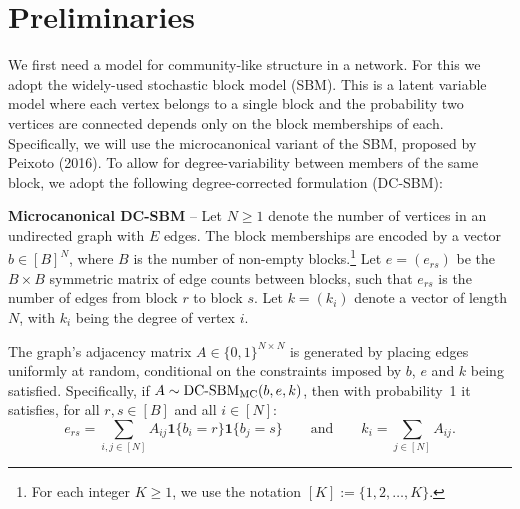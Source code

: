 \section{Preliminaries}

We first need a model for community-like structure in a network. For this we adopt the widely-used stochastic block model (SBM). This is a latent variable model where each vertex belongs to a single block and the probability two vertices are connected depends only on the block memberships of each.
Specifically, we will use the microcanonical variant of the SBM, proposed by Peixoto (2016). To allow for degree-variability between members of the same block, we adopt the following degree-corrected 
formulation (DC-SBM):

\textbf{Microcanonical DC-SBM} --
Let $N \geq 1$ denote the number of vertices in an undirected graph
with $E$ edges. The block memberships are encoded by a vector $b \in [B]^N$,
where $B$ is the number of non-empty blocks.\footnote{For each integer $K\geq 1$, we use the notation $[K]:=\{1,2,\ldots,K\}$.}
	Let $e=(e_{rs})$ be the $B \times B$ symmetric matrix of edge counts 
between blocks, such that $e_{rs}$ is the number of edges from block $r$ to 
block $s$. 
	Let $k =(k_i)$ denote a vector of length $N$, with $k_i$ being the degree of vertex $i$.

The graph's adjacency matrix $A \in \{0,1\}^{N \times N}$ is generated 
by placing edges uniformly at random, conditional
on the constraints imposed by $b$, $e$ and $k$ being satisfied.
Specifically, if $A \sim \mbox{\rm DC-SBM}_{\rm MC} (b, e, k)$,
then with probability~1 it satisfies,
for all $r,s\in[B]$
and all $i\in[N]$:
%
\begin{equation}
	e_{rs} = \sum_{i, j \in [N]} A_{ij} 
\boldsymbol{1} \{b_i = r\} \boldsymbol{1} \{b_j = s\} 
	\qquad 
	\textrm{and} \qquad
	k_i = \sum_{j \in [N]} A_{ij}.
	\label{eqn:sbm-constraints}
\end{equation}
